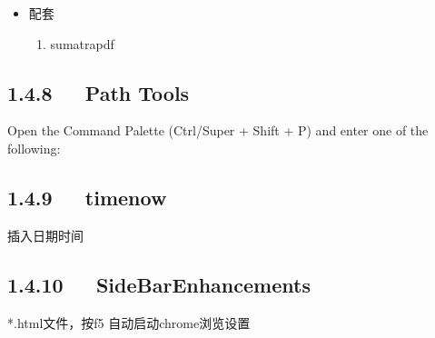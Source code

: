 \documentclass[letterpaper,12pt,english]{sphinxmanual}
\begin{document}
\begin{itemize}
\item {} 
配套
\begin{enumerate}
%
\item {} 
sumatrapdf


\end{enumerate}

\end{itemize}


\subsection{1.4.8   Path Tools}
\label{\detokenize{001software/001install/sublime:path-tools}}
Open the Command Palette (Ctrl/Super + Shift + P) and enter one of the
following:

\begin{sphinxVerbatim}[commandchars=\\\{\}]
  
  
  
    
    
  
  
  
\end{sphinxVerbatim}


\subsection{1.4.9   timenow}
\label{\detokenize{001software/001install/sublime:timenow}}
插入日期时间


\subsection{1.4.10   Side​Bar​Enhancements}
\label{\detokenize{001software/001install/sublime:sidebarenhancements}}
*.html文件，按f5 自动启动chrome浏览设置
\end{document}
